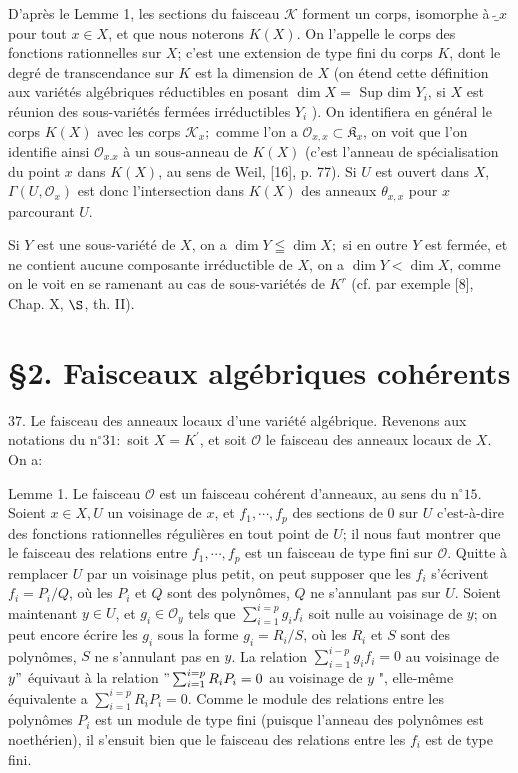 D'après le Lemme 1, les sections du faisceau $\mathcal{K}$ forment un corps, isomorphe à $\widetilde_{x}$ pour tout $x \in X$, et que nous noterons $K(X) .$ On l'appelle le corps des fonctions rationnelles sur $X$; c'est une extension de type fini du corps $K$, dont le degré de transcendance sur $K$ est la dimension de $X$ (on étend cette définition aux variétés algébriques réductibles en posant $\operatorname{dim} X=$ Sup dim $Y_{i}$, si $X$ est réunion des sous-variétés fermées irréductibles $Y_{i}$ ). On identifiera en général le corps $K(X)$ avec les corps $\mathcal{K}_{x} ;$ comme l'on a $\mathcal{O}_{x, x} \subset \mathfrak{K}_{x}$, on voit que l'on identifie ainsi $\mathcal{O}_{x . x}$ à un sous-anneau de $K(X)$ (c'est l'anneau de spécialisation du point $x$ dans $K(X)$, au sens de Weil, [16], p. 77). Si $U$ est ouvert dans $X$, $\Gamma\left(U, \mathcal{O}_{x}\right)$ est donc l'intersection dans $K(X)$ des anneaux $\theta_{x, x}$ pour $x$ parcourant $U$.

Si $Y$ est une sous-variété de $X$, on a $\operatorname{dim} Y \leqq \operatorname{dim} X ;$ si en outre $Y$ est fermée, et ne contient aucune composante irréductible de $X$, on a $\operatorname{dim} Y<\operatorname{dim} X$, comme on le voit en se ramenant au cas de sous-variétés de $K^{r}$ (cf. par exemple [8], Chap. X, $\S$, th. II).

\section{§2. Faisceaux algébriques cohérents}

37. Le faisceau des anneaux locaux d'une variété algébrique. Revenons aux notations du $\mathrm{n}^{\circ} 31:$ soit $X=K^{\prime}$, et soit $\mathcal{O}$ le faisceau des anneaux locaux de $X$. On a:

Lemme 1. Le faisceau $\mathcal{O}$ est un faisceau cohérent d'anneaux, au sens du $\mathrm{n}^{\circ} 15$. Soient $x \in X, U$ un voisinage de $x$, et $f_{1}, \cdots, f_{p}$ des sections de 0 sur $U$ c'est-à-dire des fonctions rationnelles régulières en tout point de $U$; il nous faut montrer que le faisceau des relations entre $f_{1}, \cdots, f_{p}$ est un faisceau de type fini sur $\mathcal{O}$. Quitte à remplacer $U$ par un voisinage plus petit, on peut supposer que les $f_{i}$ s'écrivent $f_{i}=P_{i} / Q$, où les $P_{i}$ et $Q$ sont des polynômes, $Q$ ne s'annulant pas sur $U$. Soient maintenant $y \in U$, et $g_{i} \in \mathcal{O}_{y}$ tels que $\sum_{i=1}^{i=p} g_{i} f_{i}$ soit nulle au voisinage de $y$; on peut encore écrire les $g_{i}$ sous la forme $g_{i}=R_{i} / S$, où les $R_{i}$ et $S$ sont des polynômes, $S$ ne s'annulant pas en $y$. La relation $\sum_{i=1}^{i-p} g_{i} f_{i}=0$ au voisinage de $y "$ équivaut à la relation $" \sum_{i=1}^{i=p} R_{i} P_{i}=0$ au voisinage de $y$ ", elle-même équivalente a $\sum_{i=1}^{i=p} R_{i} P_{i}=0$. Comme le module des relations entre les polynômes $P_{i}$ est un module de type fini (puisque l'anneau des polynômes est noethérien), il s'ensuit bien que le faisceau des relations entre les $f_{i}$ est de type fini.


